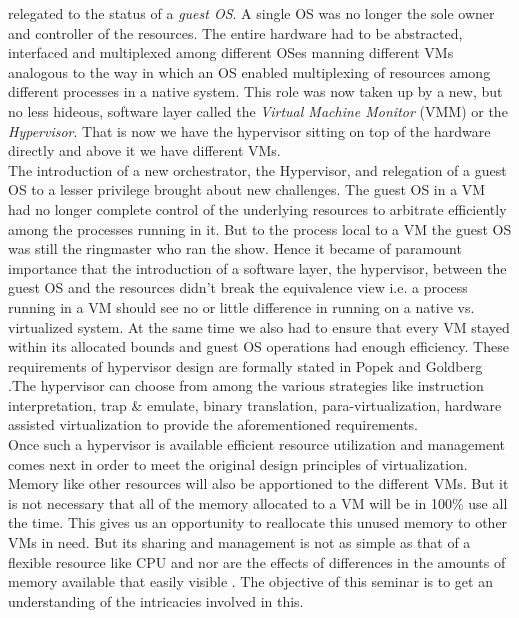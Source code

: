 relegated to the status of a \textit{guest OS}. A single OS was no longer the sole owner and
controller of the resources. The entire hardware had to be abstracted, interfaced and multiplexed
among different OSes manning different VMs analogous to the way in which an OS enabled
multiplexing of resources among different processes in a native system. This role was now taken up
by a new, but no less hideous, software layer called the \textit{Virtual Machine Monitor} (VMM) or
the \textit{Hypervisor}. That is now we have the hypervisor sitting on top of the hardware 
directly and above it we have different VMs.\\
The introduction of a new orchestrator, the Hypervisor, and relegation of a guest OS to a lesser
privilege brought about new challenges. The guest OS in a VM had no longer complete control of the
underlying resources to arbitrate efficiently among the processes running in it. But to the
process local to a VM the guest OS was still the ringmaster who ran the show. Hence it became of
paramount importance that the introduction of a software layer, the hypervisor, between the guest
OS and the resources didn't break the equivalence view  i.e. a process running in a VM should see
no or little difference in running on a native vs. virtualized system. At the same time we also
had to ensure that every VM stayed within its allocated bounds and guest OS operations had enough
efficiency. These requirements of hypervisor design are formally stated in Popek and Goldberg
\citep{Popek1974}.The hypervisor can choose from among the various strategies like instruction
interpretation, trap \& emulate, binary translation, para-virtualization, hardware assisted
virtualization to provide the aforementioned requirements.\\
Once such a hypervisor is available efficient resource utilization and management comes next in
order to meet the original design principles of virtualization. Memory like other
resources will also be apportioned to the different VMs. But it is not necessary that all  of the
memory allocated to a VM will be in 100\% use all the time. This gives us an opportunity to
reallocate this unused memory to other VMs in need. But its sharing and management is not as
simple as that of a flexible resource like CPU and nor are the effects of differences in the
amounts of memory available that easily visible \citep{Mortar2014}. The objective of this seminar
is to get an understanding of the intricacies involved in this. 

